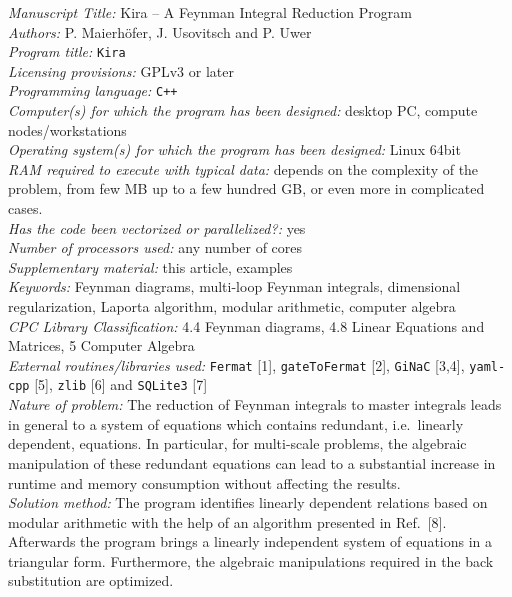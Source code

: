 \documentclass[a4paper,12pt]{scrartcl}
\newcommand*{\kira}{\texttt{Kira}}
\newcommand*{\ginac}{\texttt{GiNaC}}
\newcommand*{\zlib}{\texttt{zlib}}
\newcommand*{\yamlcpp}{\texttt{yaml-cpp}}
\newcommand*{\gatetofermat}{\texttt{gateToFermat}}
\newcommand*{\fermat}{\texttt{Fermat}}
\newcommand*{\sqlite}{\texttt{SQLite3}}
\begin{document}
\begin{small}
\noindent
{\em Manuscript Title:} Kira -- A Feynman Integral Reduction Program\\
{\em Authors:} P. Maierh\"ofer, J. Usovitsch  and P. Uwer\\
{\em Program title:} \kira\\
{\em Licensing provisions:} GPLv3 or later\\
{\em Programming language:} \texttt{C++}\\
{\em Computer(s) for which the program has been designed:} desktop PC, compute nodes/workstations\\
{\em Operating system(s) for which the program has been designed:} Linux 64bit\\
{\em RAM required to execute with typical data:} depends on the complexity of the problem, from few MB up to a few hundred GB, or even
    more in complicated cases.\\
{\em Has the code been vectorized or parallelized?:} yes\\
{\em Number of processors used: } any number of cores\\
{\em Supplementary material:} this article, examples\\
{\em Keywords:} Feynman diagrams, multi-loop Feynman integrals, dimensional regularization, Laporta algorithm, modular
arithmetic, computer algebra\\
{\em CPC Library Classification:} 4.4 Feynman diagrams, 4.8 Linear Equations and Matrices, 5 Computer Algebra\\
{\em External routines/libraries used:} \fermat{} [1], \gatetofermat{} [2], \ginac{} [3,4], \yamlcpp{} [5], \zlib{} [6] and \sqlite{} [7]\\
{\em Nature of problem:}
The reduction of Feynman integrals to master integrals leads in
general to a system of equations which contains redundant, i.e.\ linearly
dependent, equations.  In particular, for multi-scale problems, the algebraic
manipulation of these redundant equations can lead to a substantial increase in
runtime and memory consumption without affecting the results. \\
{\em Solution method:}
The program identifies linearly dependent relations based on modular
arithmetic with the help of an algorithm presented in Ref.~[8]. Afterwards the program brings a linearly independent system of equations in a triangular form. Furthermore, the algebraic  manipulations required in the back substitution are optimized.\\

\end{small}
\end{document}
